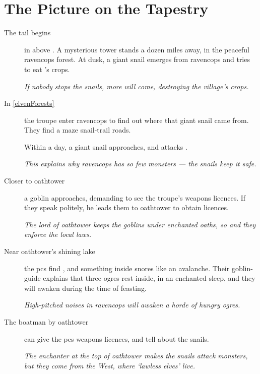 \enchantedMap

\section*{The Picture on the Tapestry}

\begin{multicols}{2}

\begin{description}
  \item[The tail begins]
  in  above .
  A mysterious tower stands a dozen miles away, in the peaceful \gls{ravencops} forest.
  At dusk, a giant snail emerges from \gls{ravencops} and tries to eat 's crops.

  \textit{If nobody stops the snails, more will come, destroying the \gls{village}'s crops.}

  \item[In \autoref{elvenForests}]
  the troupe enter \gls{ravencops} to find out where that giant snail came from.
  They find a maze snail-trail roads.

  Within a day, a giant snail approaches, and attacks .

  \textit{This explains why \gls{ravencops} has so few monsters --- the snails keep it safe.}

  \item[Closer to \gls{oathtower}]
  a goblin approaches, demanding to see the troupe's weapons licences.
  If they speak politely, he leads them to \gls{oathtower} to obtain licences.

  \textit{The lord of \gls{oathtower} keeps the goblins under enchanted oaths, so and they enforce the local laws.}

  \item[Near \gls{oathtower}'s shining lake]
  the \glspl{pc} find , and something inside snores like an avalanche.
  Their goblin-guide explains that three \glspl{ogre} rest inside, in an enchanted sleep, and they will awaken during the time of feasting.

  \textit{High-pitched noises in \gls{ravencops} will awaken a horde of hungry \glspl{ogre}.}

  \item[The boatman by \gls{oathtower}]
  can give the \glspl{pc} weapons licences, and tell about the snails.

  \textit{The enchanter at the top of \gls{oathtower} makes the snails attack \glspl{monster}, but they come from the West, where `lawless elves' live.}


\end{description}
\end{multicols}
